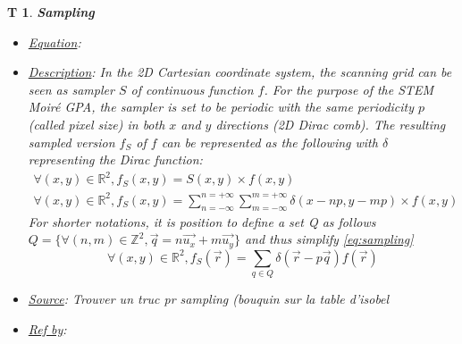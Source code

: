 \documentclass[12pt]{article}
\newtheorem{T}{T}
\begin{document}
\begin{T}
\normalfont \textbf{Sampling}
\begin{itemize}
\item \underline{Equation}: 
\item \underline{Description}: In the 2D Cartesian coordinate system, the scanning grid can be seen as sampler $S$ of continuous function $f$. For the purpose of the STEM Moir{\'e} GPA, the sampler is set to be periodic with the same periodicity $p$ (called pixel size) in both $x$ and $y$ directions (2D Dirac comb). The resulting sampled version $f_S$ of $f$ can be represented as the following with $\delta$ representing the Dirac function:
\begin{equation}
\begin{gathered}
\forall (x,y) \in \mathbb{R}^{2}, f_S(x,y)=S(x,y)\times f(x,y) \\
\forall (x,y) \in \mathbb{R}^{2}, f_S(x,y)=\sum_{n=-\infty}^{n=+\infty}\sum_{m=-\infty}^{m=+\infty}\delta(x-np,y-mp)\times f(x,y)
\end{gathered}
\label{eq:sampling}
\end{equation}
For shorter notations, it is position to define a set Q as follows $Q=\{\forall (n,m) \in \mathbb{Z}^{2}, \vec{q}=n\vec{u_x}+m\vec{u_y}\}$ and thus simplify \cref{eq:sampling}
\begin{equation}
\forall (x,y) \in \mathbb{R}^{2}, f_S(\vec{r})=\sum_{q\in Q}\delta(\vec{r}-p\vec{q}) f(\vec{r})
\label{eq:sampling_simplified}
\end{equation}
\item \underline{Source}: Trouver un truc pr sampling (bouquin sur la table d'isobel
\item \underline{Ref by}:
\end{itemize}
\label{T_1}
\end{T}
\end{document}
